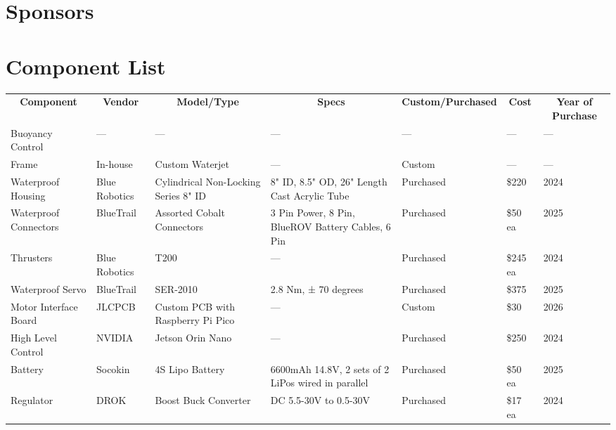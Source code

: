 \documentclass[conference]{IEEEtran}
\begin{document}
\clearpage
\onecolumn
\begin{appendices}

\section{Sponsors}

\clearpage

\section{Component List}

\begin{table}[htp]
\begin{center}
\begin{tabularx}{\linewidth}{|*{7}{X|}}

\hline
\multicolumn{1}{|c|}{\textbf{Component}} & \multicolumn{1}{c|}{\textbf{Vendor}} & \multicolumn{1}{c|}{\textbf{Model/Type}} & \multicolumn{1}{c|}{\textbf{Specs}} & \multicolumn{1}{c|}{\textbf{Custom/Purchased}} & \multicolumn{1}{c|}{\textbf{Cost}} & \multicolumn{1}{c|}{\textbf{Year of Purchase}} \\ \hhline{|=======|}
Buoyancy Control & --- & --- & --- & --- & --- & --- \\ \hline
Frame & In-house & Custom Waterjet & --- & Custom & --- & --- \\ \hline
Waterproof Housing & Blue Robotics & Cylindrical Non-Locking Series 8" ID & 8" ID, 8.5" OD, 26" Length Cast Acrylic Tube & Purchased & \$220 & 2024 \\ \hline
Waterproof Connectors & BlueTrail & Assorted Cobalt Connectors & 3 Pin Power, 8 Pin, BlueROV Battery Cables, 6 Pin & Purchased & \$50 ea & 2025 \\ \hline
Thrusters & Blue Robotics & T200 & --- & Purchased & \$245 ea & 2024 \\ \hline
Waterproof Servo & BlueTrail & SER-2010 & 2.8 Nm, ± 70 degrees & Purchased & \$375 & 2025 \\ \hline
Motor Interface Board & JLCPCB & Custom PCB with Raspberry Pi Pico & --- & Custom & \$30 & 2026 \\ \hline
High Level Control & NVIDIA & Jetson Orin Nano & --- & Purchased & \$250 & 2024 \\ \hline
Battery & Socokin & 4S Lipo Battery & 6600mAh 14.8V, 2 sets of 2 LiPos wired in parallel & Purchased & \$50 ea & 2025 \\ \hline 
Regulator & DROK & Boost Buck Converter & DC 5.5-30V to 0.5-30V & Purchased & \$17 ea & 2024 \\ \hline

\end{tabularx}
\end{center}
\end{table}
\end{appendices}
\end{document}
